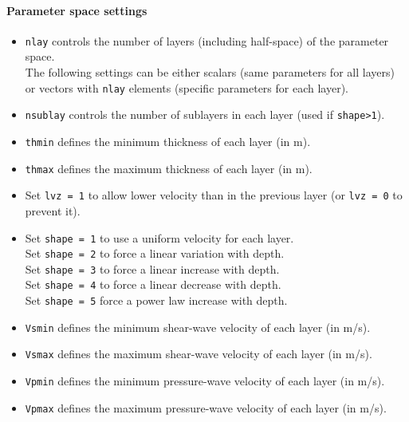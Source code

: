 \documentclass[twoside,a4paper]{article}
\begin{document}
\paragraph{Parameter space settings}
\begin{itemize}[leftmargin=*]
\setlength\itemsep{2ex}
\item \verb|nlay| controls the number of layers (including half-space) of the parameter space.\\[1ex]

The following settings can be either scalars (same parameters for all layers) or vectors with \verb|nlay| elements (specific parameters for each layer).\\
\item \verb|nsublay| controls the number of sublayers in each layer (used if \verb|shape>1|).

\item \verb|thmin| defines the minimum thickness of each layer (in m).

\item \verb|thmax| defines the maximum thickness of each layer (in m).\\[2ex]

\item Set \verb|lvz = 1| to allow lower velocity than in the previous layer (or \verb|lvz = 0| to prevent it).

\item Set \verb|shape = 1| to use a uniform velocity for each layer.\\[1ex]
Set \verb|shape = 2| to force a linear variation with depth.\\[1ex]
Set \verb|shape = 3| to force a linear increase with depth.\\[1ex]
Set \verb|shape = 4| to force a linear decrease with depth.\\[1ex]
Set \verb|shape = 5| force a power law increase with depth.\\[2ex]

\item \verb|Vsmin| defines the minimum shear-wave velocity of each layer (in m/s).

\item \verb|Vsmax| defines the maximum shear-wave velocity of each layer (in m/s).

\item \verb|Vpmin| defines the minimum pressure-wave velocity of each layer (in m/s).

\item \verb|Vpmax| defines the maximum pressure-wave velocity of each layer (in m/s).


\end{itemize}
\end{document}
